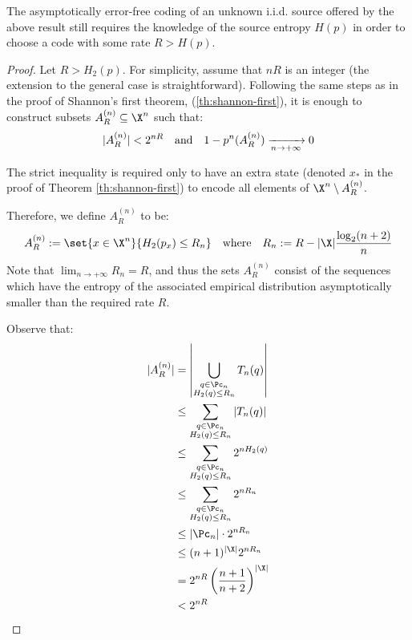 \documentclass[toc, titlepaged]{../cs-classes/cs-classes}
\begin{document}
\begin{remark}
    The asymptotically error-free coding of an unknown i.i.d. source offered by the above result still requires the knowledge of the source entropy $H(p)$ in order to choose a code with some rate $R>H(p)$. 
\end{remark}

\begin{proof}
    Let $R>H_2(p)$. For simplicity, assume that $nR$ is an integer (the extension to the general case is straightforward). Following the same steps as in the proof of Shannon's first theorem, (\ref{th:shannon-first}), it is enough to construct subsets $A_R^{(n)}\subseteq\X^n$ such that:
    \begin{equation*}
        |A_R^{(n)}|<2^{nR} \quad \textnormal{and} \quad 1-p^n(A_R^{(n)}) \xrightarrow[n\to+\infty]{} 0
    \end{equation*}

    The strict inequality is required only to have an extra state (denoted $x_*$ in the proof of Theorem \ref{th:shannon-first}) to encode all elements of $\X^n\setminus A_R^{(n)}$.

    Therefore, we define $A_R^{(n)}$ to be:
    \begin{equation*}
        A_R^{(n)} := \set{x\in\X^n}{H_2(p_x)\leq R_n} \quad \textnormal{where} \quad R_n := R-|\X|\frac{\log_2(n+2)}{n}
    \end{equation*}
    Note that $\lim_{n\to+\infty}R_n=R$, and thus the sets $A_R^{(n)}$ consist of the sequences which have the entropy of the associated empirical distribution asymptotically smaller than the required rate $R$.

    Observe that:
    \begin{equation*}
        \begin{aligned}
            |A_R^{(n)}|&=\left|\bigcup_{\substack{q\in\Pc_n\\H_2(q)\leq R_n}}T_n(q)\right|\\
            &\leq \sum_{\substack{q\in\Pc_n\\H_2(q)\leq R_n}}|T_n(q)|\\
            &\leq \sum_{\substack{q\in\Pc_n\\H_2(q)\leq R_n}}2^{nH_2(q)}\\
            &\leq \sum_{\substack{q\in\Pc_n\\H_2(q)\leq R_n}}2^{nR_n}\\
            &\leq |\Pc_n|\cdot 2^{nR_n}\\
            &\leq (n+1)^{|\X|}2^{nR_n}\\
            &= 2^{nR}\left(\frac{n+1}{n+2}\right)^{|\X|}\\
            &< 2^{nR}
        \end{aligned}
    \end{equation*}


\end{proof}
\end{document}
